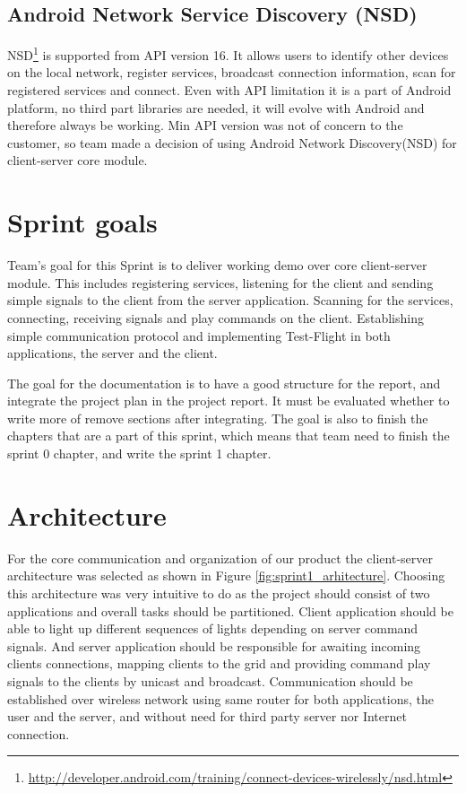 \subsection{Android Network Service Discovery (NSD)}
NSD\footnote{\url{http://developer.android.com/training/connect-devices-wirelessly/nsd.html}} is supported from API version 16. 
It allows users to identify other devices on the local network, register services, broadcast connection information, scan for registered services and connect.
Even with API limitation it is a part of Android platform, no third part libraries are needed, it will evolve with Android and therefore always be working.
Min API version was not of concern to the customer, so team made a decision of using Android Network Discovery(NSD) for client-server core module.


\section{Sprint goals}

Team's goal for this Sprint is to deliver working demo over core client-server module.
This includes registering services, listening for the client and sending simple signals to the client from the server application.
Scanning for the services, connecting, receiving signals and play commands on the client.
Establishing simple communication protocol and implementing Test-Flight in both applications, the server and the client.

The goal for the documentation is to have a good structure for the report, and integrate the project plan in the project report. It must be evaluated whether to write more of remove sections after integrating. The goal is also to finish the chapters that are a part of this sprint, which means that team need to finish the sprint 0 chapter, and write the sprint 1 chapter.

\section{Architecture}
For the core communication and organization of our product the client-server architecture was selected as shown in Figure \ref{fig:sprint1_arhitecture}.
Choosing this architecture was very intuitive to do as the project should consist of two applications and overall tasks should be partitioned. 
Client application should be able to light up different sequences of lights depending on server command signals.
And server application should be responsible for awaiting incoming clients connections, mapping clients to the grid and providing command play signals to the clients by unicast and broadcast.
Communication should be established over wireless network using same router for both applications, the user and the server, and without need for third party server nor Internet connection.

